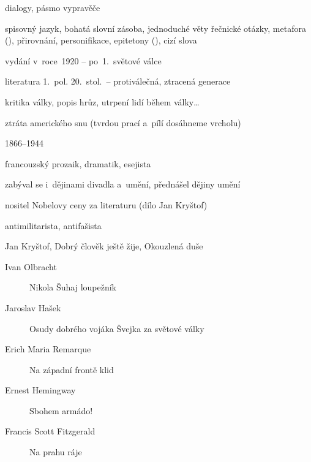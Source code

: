 { %
dialogy, pásmo vypravěče

\newpart

spisovný jazyk, bohatá slovní zásoba, jednoduché věty
řečnické otázky, metafora (),
přirovnání, personifikace, epitetony (), cizí slova

\begin{compactitem}
	\item vydání v~roce~1920 -- po~1.~světové válce
	\item literatura 1.~pol. 20.~stol.~-- protiválečná, ztracená generace
	\item kritika války, popis hrůz, utrpení lidí během války\dots
	\item ztráta amerického snu (tvrdou prací a~pílí dosáhneme vrcholu)
\end{compactitem}

\parag{\getauthor}
\begin{compactitem}
	\item 1866--1944
	\item francouzský prozaik, dramatik, esejista
	\item zabýval se i~dějinami divadla a~umění, přednášel dějiny umění
	\item nositel Nobelovy ceny za literaturu (dílo Jan Kryštof)
	\item antimilitarista, antifašista
	\item Jan Kryštof, Dobrý člověk ještě žije, Okouzlená duše
\end{compactitem}

\begin{description}
	\item[Ivan Olbracht] Nikola Šuhaj loupežník
	\item[Jaroslav Hašek] Osudy dobrého vojáka Švejka za světové války
	\item[Erich Maria Remarque] Na západní frontě klid
	\item[Ernest Hemingway] Sbohem armádo!
	\item[Francis Scott Fitzgerald] Na prahu ráje
\end{description}
}
